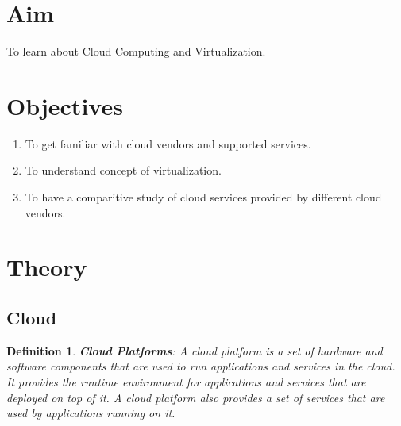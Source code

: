 \documentclass[11pt]{article}
\newtheorem{dfn}[thm]{Definition}
\begin{document}
\tableofcontents
\thispagestyle{empty}
\clearpage

\setcounter{page}{1}

\section{Aim}
To learn about Cloud Computing and Virtualization.

\section{Objectives}
\begin{enumerate}
    \item To get familiar with cloud vendors and supported services. 
    \item To understand concept of virtualization. 
    \item To have a comparitive study of cloud services provided by different cloud vendors. 
\end{enumerate}

\section{Theory}

\subsection{Cloud}

\begin{dfn}
    \textbf{Cloud Platforms}: A cloud platform is a set of hardware and software components that are used to run applications and services in the cloud. It provides the runtime environment for applications and services that are deployed on top of it. A cloud platform also provides a set of services that are used by applications running on it. 
\end{dfn}
\end{document}
